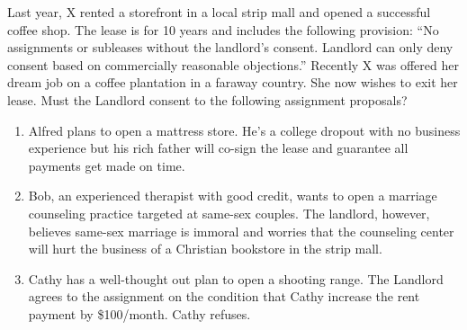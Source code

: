 
\item Last year, X rented a storefront in a local strip mall and opened a
successful coffee shop.  The lease is for 10 years and includes the following
provision: ``No assignments or subleases without the landlord's consent. 
Landlord can only deny consent based on commercially reasonable objections.'' 
Recently X was offered her dream job on a coffee plantation in a faraway
country.  She now wishes to exit her lease.  Must the Landlord consent to the
following assignment proposals?
\begin{enumerate}
\item Alfred plans to open a mattress store.  He's a college dropout with no
business experience but his rich father will co-sign the lease and guarantee
all payments get made on time.

\item Bob, an experienced therapist with good credit, wants to open a marriage
counseling practice targeted at same-sex couples.  The landlord, however,
believes same-sex marriage is immoral and worries that the counseling center
will hurt the business of a Christian bookstore in the strip mall.

\item Cathy has a well-thought out plan to open a shooting range.  The Landlord
agrees to the assignment on the condition that Cathy increase the rent payment
by \$100/month.  Cathy refuses. 
\end{enumerate}

